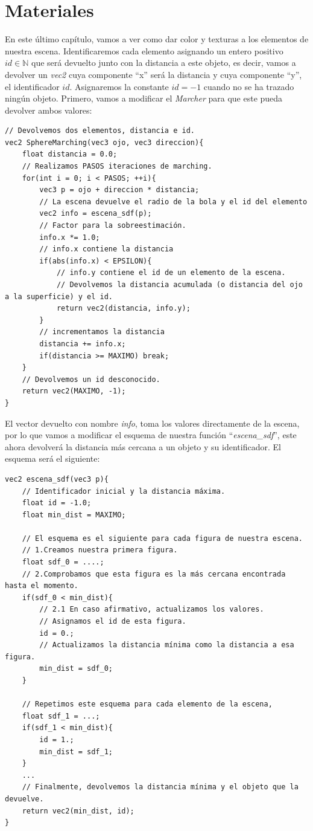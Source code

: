 \chapter{Materiales\label{ch:materiales}}
En este último capítulo, vamos a ver como dar color y texturas a los elementos de nuestra escena. Identificaremos cada elemento asignando un entero positivo \(id \in \mathbb{N}\) que será devuelto junto con la distancia a este objeto, es decir, vamos a devolver un \textit{vec2} cuya componente \enquote{x} será la distancia y cuya componente \enquote{y}, el identificador \(id\). Asignaremos la constante \(id=-1\) cuando no se ha trazado ningún objeto. Primero, vamos a modificar el \textit{Marcher} para que este pueda devolver ambos valores:

\begin{lstlisting}
// Devolvemos dos elementos, distancia e id.
vec2 SphereMarching(vec3 ojo, vec3 direccion){
    float distancia = 0.0;
    // Realizamos PASOS iteraciones de marching.
    for(int i = 0; i < PASOS; ++i){
        vec3 p = ojo + direccion * distancia;
        // La escena devuelve el radio de la bola y el id del elemento
        vec2 info = escena_sdf(p);
        // Factor para la sobreestimación.
        info.x *= 1.0;
        // info.x contiene la distancia
        if(abs(info.x) < EPSILON){
            // info.y contiene el id de un elemento de la escena.
            // Devolvemos la distancia acumulada (o distancia del ojo a la superficie) y el id.
            return vec2(distancia, info.y);
        }
        // incrementamos la distancia
        distancia += info.x;
        if(distancia >= MAXIMO) break;
    }
    // Devolvemos un id desconocido.
    return vec2(MAXIMO, -1);
}
\end{lstlisting}

El vector devuelto con nombre \textit{info}, toma los valores directamente de la escena, por lo que vamos a modificar el esquema de nuestra función \enquote{\textit{escena\_sdf}}, este ahora devolverá la distancia más cercana a un objeto y su identificador. El esquema será el siguiente:

\begin{lstlisting}
vec2 escena_sdf(vec3 p){
    // Identificador inicial y la distancia máxima.
    float id = -1.0;
    float min_dist = MAXIMO;
    
    // El esquema es el siguiente para cada figura de nuestra escena.
    // 1.Creamos nuestra primera figura.
    float sdf_0 = ....;
    // 2.Comprobamos que esta figura es la más cercana encontrada hasta el momento.
    if(sdf_0 < min_dist){
        // 2.1 En caso afirmativo, actualizamos los valores.
        // Asignamos el id de esta figura.
        id = 0.;
        // Actualizamos la distancia mínima como la distancia a esa figura.
        min_dist = sdf_0;
    }
    
    // Repetimos este esquema para cada elemento de la escena,
    float sdf_1 = ...;
    if(sdf_1 < min_dist){
        id = 1.;
        min_dist = sdf_1;
    }
    ...
    // Finalmente, devolvemos la distancia mínima y el objeto que la devuelve.
    return vec2(min_dist, id);
}
\end{lstlisting}

